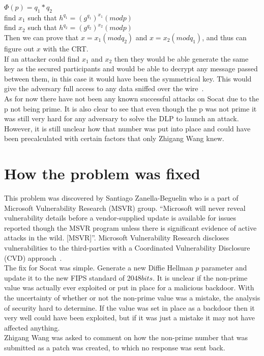 \documentclass[letterpaper,11pt,notitlepage,fleqn]{article}
\begin{document}
\indent $\Phi(p)=q_{1}*q_{2}$\\
\indent find $x_{1}$ such that $h^{q_{1}}=(g^{q_{1}})^{x_1}(mod p)$ \\
\indent find $x_{2}$ such that $h^{q_{2}}=(g^{q_{2}})^{x_2}(mod p)$ \\
\indent Then we can prove that $x=x_{1}(mod q_{2})$ and $x=x_{2}(mod q_{1})$, and thus can figure out $x$ with the CRT. \\
\indent If an attacker could find $x_{1}$ and $x_{2}$ then they would be able generate the same key as the secured participants and would be able to decrypt any message passed between them, in this case it would have been the symmetrical key. This would give the adversary full access to any data sniffed over the wire~\cite{thai}.
\\
\indent As for now there have not been any known successful attacks on Socat due to the p not being prime. It is also clear to see that even though the p was not prime it was still very hard for any adversary to solve the DLP to launch an attack. However, it is still unclear how that number was put into place and could have been precalculated with certain factors that only Zhigang Wang knew.
\section{How the problem was fixed}
This problem was discovered by Santiago Zanella-Beguelin who is a part of Microsoft Vulnerability Research (MSVR) group. “Microsoft will never reveal vulnerability details before a vendor-supplied update is available for issues reported though the MSVR program unless there is significant evidence of active attacks in the wild. [MSVR]”. Microsoft Vulnerability Research discloses vulnerabilities to the third-parties with a Coordinated Vulnerability Disclosure (CVD)
approach~\cite{micro}.
\\
\indent The fix for Socat was simple. Generate a new Diffie Hellman $p$ parameter and update it to the new FIPS standard of $2048bits$. It is unclear if the non-prime value was actually ever exploited or put in place for a malicious backdoor. With the uncertainty of whether or not the non-prime value was a mistake, the analysis of security hard to determine. If the value was set in place as a backdoor then it very well could have been exploited, but if it was just a mistake it may not
have affected anything.
\\
Zhigang Wang was asked to comment on how the non-prime number that was submitted as a patch was created, to which no response was sent back. 
\end{document}
